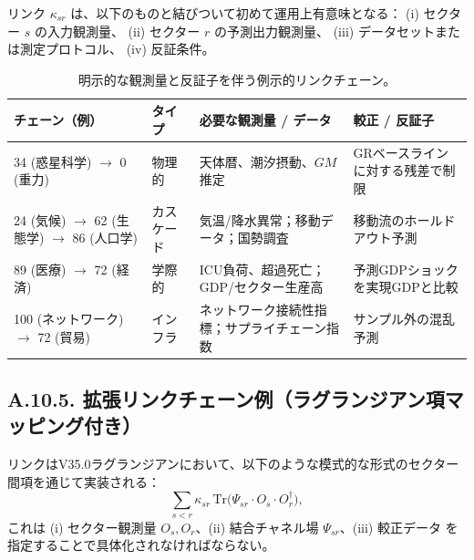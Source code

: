 \documentclass[13pt,a4paper]{ltjsarticle}
\begin{document}
	リンク $\kappa_{sr}$ は、以下のものと結びついて初めて運用上有意味となる：
	(i) セクター $s$ の入力観測量、
	(ii) セクター $r$ の予測出力観測量、
	(iii) データセットまたは測定プロトコル、
	(iv) 反証条件。
	
	\begin{table}[htbp]
		\centering
		\small
		\begin{tabular}{p{}p{}p{}p{}}
			\toprule
			\textbf{チェーン（例）} & \textbf{タイプ} & \textbf{必要な観測量 / データ} & \textbf{較正 / 反証子} \\
			\midrule
			34 (惑星科学) $\to$ 0 (重力) & 物理的 & 天体暦、潮汐摂動、$GM$ 推定 & GRベースラインに対する残差で制限 \\
			\midrule
			24 (気候) $\to$ 62 (生態学) $\to$ 86 (人口学) & カスケード & 気温/降水異常；移動データ；国勢調査 & 移動流のホールドアウト予測 \\
			\midrule
			89 (医療) $\to$ 72 (経済) & 学際的 & ICU負荷、超過死亡；GDP/セクター生産高 & 予測GDPショックを実現GDPと比較 \\
			\midrule
			100 (ネットワーク) $\to$ 72 (貿易) & インフラ & ネットワーク接続性指標；サプライチェーン指数 & サンプル外の混乱予測 \\
			\bottomrule
		\end{tabular}
		\caption{明示的な観測量と反証子を伴う例示的リンクチェーン。}
		\label{tab:link-chains-auditable}
	\end{table}
	
	\subsection*{A.10.5. 拡張リンクチェーン例（ラグランジアン項マッピング付き）}
	
	リンクはV35.0ラグランジアンにおいて、以下のような模式的な形式のセクター間項を通じて実装される：
	$$
	\sum_{s<r}\kappa_{sr}\,\mathrm{Tr}\!\big(\Psi_{sr}\cdot O_s\cdot O_r^\dagger\big),
	$$
	これは (i) セクター観測量 $O_s,O_r$、(ii) 結合チャネル場 $\Psi_{sr}$、(iii) 較正データ を指定することで具体化されなければならない。
	
\end{document}
